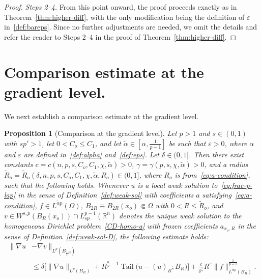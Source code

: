 \documentclass[10pt,letterpaper]{amsart}
\newtheorem{proposition}[theorem]{Proposition}
\theoremstyle{definition}
\numberwithin{theorem}{section}
\numberwithin{equation}{section}
\newcommand{\R}{\ensuremath{\mathbb{R}}}
\newcommand{\1}{\ensuremath{\mathds{1}}}
\renewcommand{\epsilon}{\varepsilon}
\renewcommand{\epsilon}{\varepsilon}
\DeclareMathOperator{\Tail}{Tail}
\numberwithin{equation}{section}
\begin{document}
\begin{proof}
\smallskip

\noindent
\textit{Steps 2--4.} 
From this point onward, the proof proceeds exactly as in Theorem~\ref{thm:higher-diff}, 
with the only modification being the definition of $\bar\epsilon$ in~\eqref{def:bareps}. 
Since no further adjustments are needed, we omit the details and refer the reader to Steps 2--4 in the proof of Theorem~\ref{thm:higher-diff}. 
\end{proof}



\section{Comparison estimate at the gradient level.}

We next establish a comparison estimate at the gradient level.
\begin{proposition}[Comparison at the gradient level]\label{prop:comparison}
Let $p>1$ and $s\in(0,1)$ with $sp'>1$, let $0<C_o\le C_1$, and let $\tilde\alpha\in[\alpha,\frac{1}{p-1}]$ be such that $\epsilon>0$, where $\alpha$ and $\epsilon$ are defined in~\eqref{def:alpha} and~\eqref{def:eps}.
Let $\delta\in(0,1]$. Then there exist constants 
$c=c(n,p,s,C_o,C_1,\chi,\tilde\alpha)>0$, 
$\gamma=\gamma(p,s,\chi,\tilde\alpha)>0$, 
and a radius $\widetilde R_o=\widetilde R_o(\delta , n,p,s, C_o,C_1 ,\chi,\tilde\alpha, R_o)\in(0,1]$, where $R_o$ is from~\eqref{eq:a-condition}, 
such that the following holds. 
Whenever $u$ is a local weak solution to~\eqref{eq:frac-p-lap} in the sense of Definition~\ref{def:weak-sol} with coefficients $a$ satisfying~\eqref{eq:a-condition}, $f\in L^{\tilde\alpha p}(\Omega)$, 
$B_{2R}\equiv B_{2R}(x_o)\Subset\Omega$ with $0<R\le\widetilde R_o$, 
and $v\in W^{s,p}(B_R(x_o)) \cap L^{p-1}_{sp}(\R^n)$ denotes the unique weak solution to the homogeneous Dirichlet problem~\eqref{CD-homo-a} with frozen coefficients $a_{x_o,R}$ in the sense of Definition~\ref{def:weak-sol-D}, the following estimate holds:
\begin{align*}
    \|\nabla u &- \nabla v\|_{L^p(B_{\frac14 R})}\\ 
    &\leq 
    \delta  
    \Big[ 
    \| \nabla u \|_{L^{p}(B_{R})} +  
    R^{\frac{n}{p}-1} \Tail \big(u-(u)_{{R}}; B_{R}\big)\Big] 
    +
    \frac{c}{\delta^{\frac1\gamma}} R^{\epsilon} \| f \|_{L^{\tilde \alpha p}(B_{R})}^\frac{1}{p-1}.
\end{align*}
\end{proposition}
\end{document}
